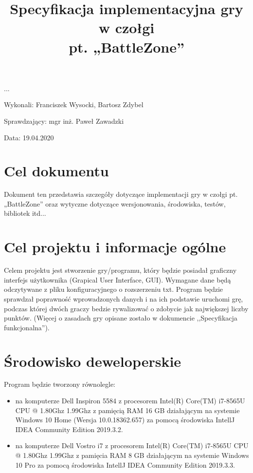 \documentclass{article}
\title{Specyfikacja implementacyjna gry w czołgi \\ pt. „BattleZone”}
\author{}
\date{}
\begin{document}
\maketitle

\begin{flushright}
\par ...
\vfill
\par
Wykonali: Franciszek Wysocki, Bartosz Zdybel

Sprawdzający: mgr inż. Paweł Zawadzki

Data: 19.04.2020
\end{flushright}

\thispagestyle{empty}
\newpage


\begin{frame}{}
    \tableofcontents
\end{frame}
\newpage

\section{Cel dokumentu}

Dokument ten przedstawia szczegóły dotyczące implementacji gry w czołgi pt. „BattleZone” oraz wytyczne dotyczące wersjonowania, środowiska, testów, bibliotek itd... 

\section{Cel projektu i informacje ogólne}

Celem projektu jest stworzenie gry/programu, który będzie posiadał graficzny interfejs użytkownika (Grapical User Interface, GUI). Wymagane dane będą odczytywane z pliku konfiguracyjnego o rozszerzeniu txt. Program będzie sprawdzał poprawność wprowadzonych danych i na ich podstawie uruchomi grę, podczas której dwóch graczy bedzie rywalizować o zdobycie jak największej liczby punktów. (Więcej o zasadach gry opisane zostało w dokumencie ,,Specyfikacja funkcjonalna'').


\section{Środowisko deweloperskie}
Program będzie tworzony równolegle:
\begin{itemize}
\item na komputerze Dell Inspiron 5584 z procesorem Intel(R) Core(TM) i7-8565U CPU @ 1.80Ghz 1.99Ghz z pamięcią RAM 16 GB działającym na systemie Windows 10 Home (Wersja 10.0.18362.657) za pomocą środowiska IntellJ IDEA Community Edition 2019.3.2.
\item na komputerze Dell Vostro i7 z procesorem Intel(R) Core(TM) i7-8565U CPU @ 1.80Ghz 1.99Ghz z pamięcia RAM 8 GB działającym na systemie Windows 10 Pro za pomocą środowiska IntellJ IDEA Community Edition 2019.3.3.
\end{itemize}
\end{document}
